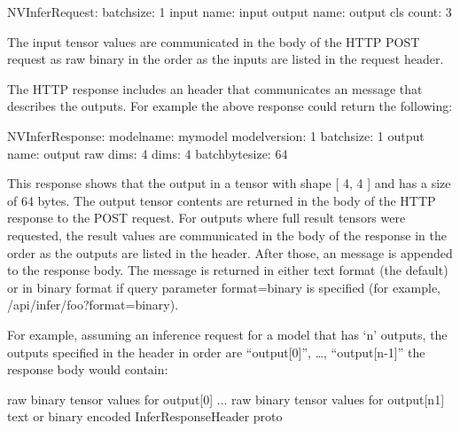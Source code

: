 \documentclass[letterpaper,10pt,english]{sphinxmanual}
\begin{document}
\begin{sphinxVerbatim}[commandchars=\\\{\}]
NV\PYGZhy{}InferRequest: batch\PYGZus{}size: 1 input \PYGZob{} name: \PYGZdq{}input\PYGZdq{} \PYGZcb{} output \PYGZob{} name: \PYGZdq{}output\PYGZdq{} cls \PYGZob{} count: 3 \PYGZcb{} \PYGZcb{}
\end{sphinxVerbatim}

The input tensor values are communicated in the body of the HTTP POST
request as raw binary in the order as the inputs are listed in the
request header.

The HTTP response includes an  header that
communicates an  message that describes
the outputs. For example the above response could return the
following:

\begin{sphinxVerbatim}[commandchars=\\\{\}]
NV\PYGZhy{}InferResponse: model\PYGZus{}name: \PYGZdq{}mymodel\PYGZdq{} model\PYGZus{}version: 1 batch\PYGZus{}size: 1 output \PYGZob{} name: \PYGZdq{}output\PYGZdq{} raw \PYGZob{} dims: 4 dims: 4 batch\PYGZus{}byte\PYGZus{}size: 64 \PYGZcb{} \PYGZcb{}
\end{sphinxVerbatim}

This response shows that the output in a tensor with shape {[} 4, 4 {]}
and has a size of 64 bytes. The output tensor contents are returned in
the body of the HTTP response to the POST request. For outputs where
full result tensors were requested, the result values are communicated
in the body of the response in the order as the outputs are listed in
the  header. After those, an
 message is appended to
the response body. The  message is returned in
either text format (the default) or in binary format if query
parameter format=binary is specified (for example,
/api/infer/foo?format=binary).

For example, assuming an inference request for a model that has ‘n’
outputs, the outputs specified in the  header in
order are “output{[}0{]}”, …, “output{[}n-1{]}” the response body would
contain:

\begin{sphinxVerbatim}[commandchars=\\\{\}]
\PYGZlt{}raw binary tensor values for output[0] \PYGZgt{}
...
\PYGZlt{}raw binary tensor values for output[n\PYGZhy{}1] \PYGZgt{}
\PYGZlt{}text or binary encoded InferResponseHeader proto\PYGZgt{}
\end{sphinxVerbatim}
\end{document}
